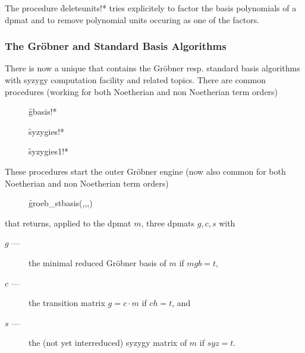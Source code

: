 The procedure \f{deleteunits!*} tries explicitely to factor the
basis polynomials of a dpmat and to remove polynomial units occuring
as one of the factors.

\subsubsection{The Gr\"obner and Standard Basis Algorithms}

There is now a unique  that contains the Gr\"obner
resp. standard basis algorithms with syzygy computation facility and
related topics. There are common procedures (working for both
Noetherian and non Noetherian term orders)
\begin{description}

\item[]
  \begin{syntax}
    \f{gbasis!*} 
  \end{syntax}
  \hypertarget{procedure:GBASIS!*}{}

\item[]
  \begin{syntax}
    \f{syzygies!*} 
  \end{syntax}
  \hypertarget{procedure:SYZYGIES!*}{}

\item[]
  \begin{syntax}
    \f{syzygies1!*} 
  \end{syntax}
  \hypertarget{procedure:SYZYGIES1!*}{}
\end{description}

These procedures start the outer Gr\"obner engine (now also common for both
Noetherian and non Noetherian term orders)
\begin{description}

\item[]
  \begin{syntax}
    \f{groeb\_stbasis}(,,,)
  \end{syntax}
  \hypertarget{procedure:GROEB_STBASIS}{}
\end{description}
that returns, applied to the dpmat $m$, three dpmats $g,c,s$ with
\begin{description}
\item[$g$ ---] the minimal reduced Gr\"obner basis of $m$ if $mgb=t$,

\item[$c$ ---] the transition matrix $g=c\cdot m$ if $ch=t$, and

\item[$s$ ---] the (not yet interreduced) syzygy matrix of $m$ if $syz=t$.
\end{description}

